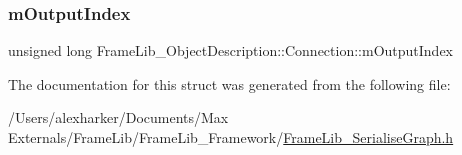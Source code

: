 \mbox{\label{struct_frame_lib___object_description_1_1_connection_a99307659f4c0672b38986604c33e914d}} 
\subsubsection{\texorpdfstring{m\+Output\+Index}{mOutputIndex}}
{\footnotesize\ttfamily unsigned long Frame\+Lib\+\_\+\+Object\+Description\+::\+Connection\+::m\+Output\+Index}



The documentation for this struct was generated from the following file\+:\begin{DoxyCompactItemize}
\item 
/\+Users/alexharker/\+Documents/\+Max Externals/\+Frame\+Lib/\+Frame\+Lib\+\_\+\+Framework/\hyperlink{_frame_lib___serialise_graph_8h}{Frame\+Lib\+\_\+\+Serialise\+Graph.\+h}\end{DoxyCompactItemize}
